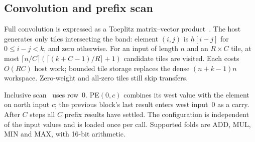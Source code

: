 \subsection{Convolution and prefix scan}

Full convolution is expressed as a Toeplitz matrix--vector
product~\cite{golub-vanloan}. The host generates only tiles intersecting the
band: element $(i,j)$ is $h[i-j]$ for $0\leq i-j<k$, and zero otherwise.
For an input of length $n$ and an $R\times C$ tile, at most
$\lceil n/C\rceil(\lceil(k+C-1)/R\rceil+1)$ candidate tiles are visited.
Each costs $O(RC)$ host work; bounded tile storage replaces the dense
$(n+k-1)n$ workspace. Zero-weight and all-zero tiles still skip transfers.

Inclusive scan~\cite{blelloch} uses row~0. PE$(0,c)$ combines its west value
with the element on north input $c$; the previous block's last result enters
west input~0 as a carry. After $C$ steps all $C$ prefix results have settled.
The configuration is independent of the input values and is loaded once per
call. Supported folds are ADD, MUL, MIN and MAX, with 16-bit arithmetic.
